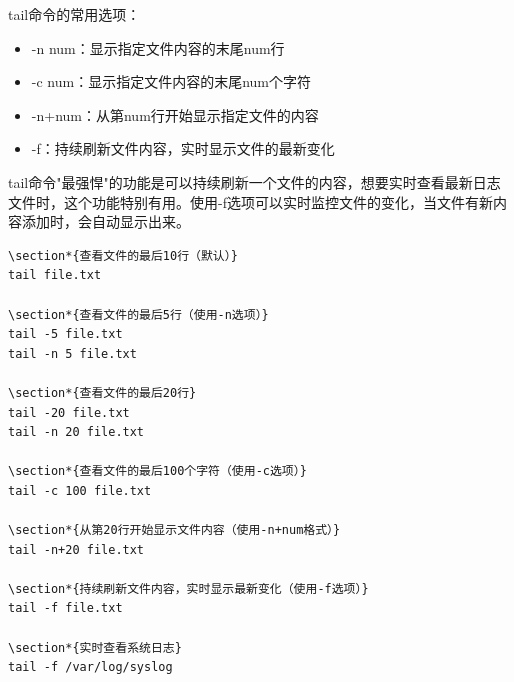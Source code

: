 \documentclass[12pt,UTF8]{ctexbook}
\begin{document}
tail命令的常用选项：
\begin{itemize}
    \item -n num：显示指定文件内容的末尾num行
    \item -c num：显示指定文件内容的末尾num个字符
    \item -n+num：从第num行开始显示指定文件的内容
    \item -f：持续刷新文件内容，实时显示文件的最新变化
\end{itemize}

tail命令"最强悍"的功能是可以持续刷新一个文件的内容，想要实时查看最新日志文件时，这个功能特别有用。使用-f选项可以实时监控文件的变化，当文件有新内容添加时，会自动显示出来。

\begin{verbatim}
\section*{查看文件的最后10行（默认）}
tail file.txt

\section*{查看文件的最后5行（使用-n选项）}
tail -5 file.txt
tail -n 5 file.txt

\section*{查看文件的最后20行}
tail -20 file.txt
tail -n 20 file.txt

\section*{查看文件的最后100个字符（使用-c选项）}
tail -c 100 file.txt

\section*{从第20行开始显示文件内容（使用-n+num格式）}
tail -n+20 file.txt

\section*{持续刷新文件内容，实时显示最新变化（使用-f选项）}
tail -f file.txt

\section*{实时查看系统日志}
tail -f /var/log/syslog
\end{verbatim}
\end{document}
